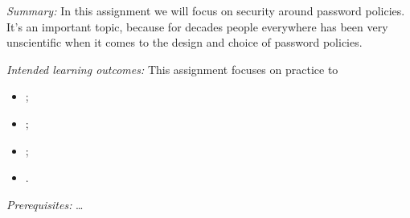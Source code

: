 
\emph{Summary:}
In this assignment we will focus on security around password policies.
It's an important topic, because for decades people everywhere has been very 
unscientific when it comes to the design and choice of password 
policies\autocite{Estes2017Aug}.

\emph{Intended learning outcomes:}
This assignment focuses on practice to
\begin{itemize}
  \item \LOrelate;
  \item \LOevaluate;
  \item \LOapply;
  \item \LOcomm.
\end{itemize}

\emph{Prerequisites:}
\dots
